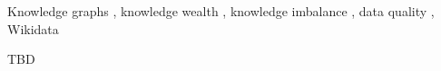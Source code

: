 \documentclass[
]{ceurart}
\begin{document}
\begin{keywords}
  Knowledge graphs \sep
  knowledge wealth \sep
  knowledge imbalance \sep
  data quality \sep
  Wikidata
\end{keywords}

\maketitle














\begin{acknowledgments}

TBD

\end{acknowledgments}


\end{document}

